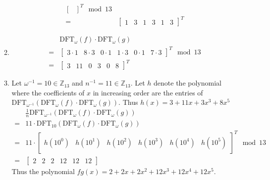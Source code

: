 \documentclass[11pt,a4paper]{article}
\begin{document}
\begin{enumerate}
\begin{enumerate}
\begin{align*}
\begin{bmatrix}
                            \end{bmatrix}^T \mod{13} \\
                        = & \begin{bmatrix}
                                1 & 3 & 1 & 3 & 1 & 3
                            \end{bmatrix}^T
                    \end{align*}
              \item \begin{align*}
                          & \text{DFT}_\omega(f) \cdot \text{DFT}_\omega(g)                       \\
                        = & \begin{bmatrix}
                                3 \cdot 1 & 8 \cdot 3 & 0 \cdot 1 & 1 \cdot 3 & 0 \cdot 1 & 7 \cdot 3
                            \end{bmatrix}^T \mod{13} \\
                        = & \begin{bmatrix}
                                3 & 11 & 0 & 3 & 0 & 8
                            \end{bmatrix}^T
                    \end{align*}
              \item Let $\omega^{-1} = 10 \in \mathbb{Z}_{13}$ and $n^{-1} = 11 \in \mathbb{Z}_{13}$. Let $h$ denote the polynomial
                    where the coefficients of $x$ in increasing order are the entries of
                    $\text{DFT}_{\omega^{-1}}(\text{DFT}_\omega(f) \cdot \text{DFT}_\omega(g))$. Thus $h(x) = 3 + 11x + 3x^3 + 8x^5$
                    \begin{align*}
                          & \frac{1}{n}\text{DFT}_{\omega^{-1}}(\text{DFT}_\omega(f) \cdot \text{DFT}_\omega(g)) \\
                        = & 11 \cdot \text{DFT}_{10}(\text{DFT}_\omega(f) \cdot \text{DFT}_\omega(g))            \\
                        = & 11 \cdot \begin{bmatrix}
                                         h(10^0) & h(10^1) & h(10^2) & h(10^3) & h(10^4) & h(10^5)
                                     \end{bmatrix}^T \mod{13}                   \\
                        = & \begin{bmatrix}
                                2 & 2 & 2 & 12 & 12 & 12
                            \end{bmatrix}
                    \end{align*}
                    Thus the polynomial $fg(x) = 2 + 2x + 2x^2 + 12x^3 + 12x^4 + 12x^5$.
          \end{enumerate}


\end{enumerate}
\end{document}
